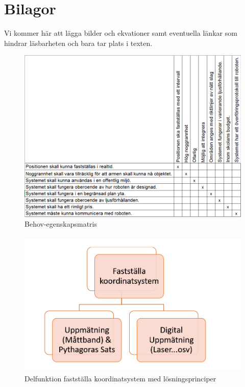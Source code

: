 \documentclass[11pt, a4paper]{report}
\begin{document}
\chapter{Bilagor}
Vi kommer här att lägga bilder och ekvationer samt eventuella länkar som hindrar läsbarheten och bara tar plats i texten.

\begin{figure}[H]
	\begin{center}
		\includegraphics [width=12cm,angle=0]{behov-egenskap-matris.png}
		\caption{Behov-egenskapsmatris}
		\label{fig:behov-egenskap}
	\end{center}
\end{figure}


\begin{figure}[H]
	\begin{center}
		\includegraphics [width=12cm, height=7cm, angle=0]{faststallakoordinatsystem.png}
		\caption{Delfunktion fastställa koordinatsystem med lösningsprinciper}
		\label{fig:koordinatsystem}
	\end{center}
\end{figure}
\end{document}

